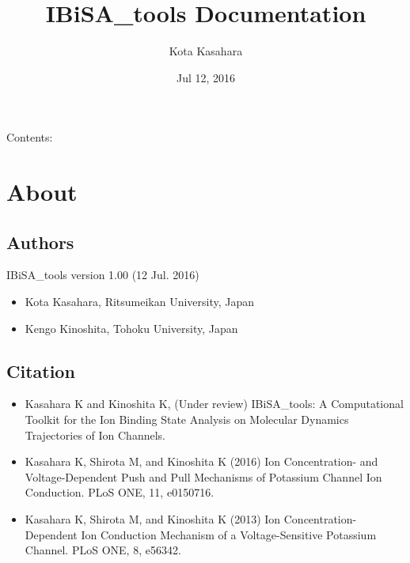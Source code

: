 \documentclass[letterpaper,10pt,english]{sphinxmanual}
\title{IBiSA\_tools Documentation}
\date{Jul 12, 2016}
\author{Kota Kasahara}
\begin{document}
\maketitle
\tableofcontents
{}\label{index::doc}


Contents:


\chapter{About}
\label{about:about}\label{about::doc}\label{about:welcome-to-ibisa-tools-s-documentation}

\section{Authors}
\label{about:authors}
IBiSA\_tools version 1.00 (12 Jul. 2016)
\begin{itemize}
\item {} 
Kota Kasahara, Ritsumeikan University, Japan

\item {} 
Kengo Kinoshita, Tohoku University, Japan

\end{itemize}


\section{Citation}
\label{about:citation}\begin{itemize}
\item {} 
Kasahara K and Kinoshita K, (Under review) IBiSA\_tools: A Computational Toolkit for the Ion Binding State Analysis on Molecular Dynamics Trajectories of Ion Channels.

\item {} 
Kasahara K, Shirota M, and Kinoshita K (2016) Ion Concentration- and Voltage-Dependent Push and Pull Mechanisms of Potassium Channel Ion Conduction. PLoS ONE, 11, e0150716.

\item {} 
Kasahara K, Shirota M, and Kinoshita K (2013) Ion Concentration-Dependent Ion Conduction Mechanism of a Voltage-Sensitive Potassium Channel. PLoS ONE, 8, e56342.

\end{itemize}
\end{document}
